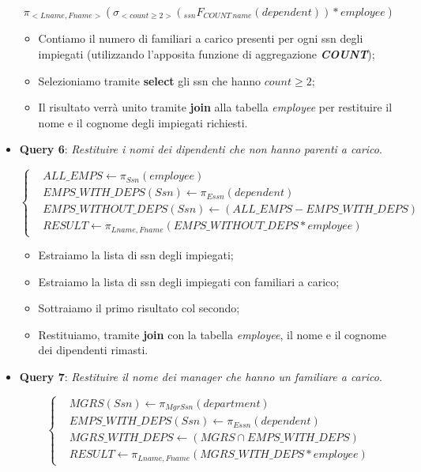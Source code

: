 \begin{itemize}
\[
	\pi_{<Lname,Fname>}(\sigma_{<count\geq 2>}(_{ssn}F_{COUNT\ name}(dependent))*employee)
\]

\begin{itemize}

\item Contiamo il numero di familiari a carico presenti per ogni ssn degli impiegati (utilizzando l’apposita funzione di aggregazione \textit{\textbf{COUNT}});
\item Selezioniamo tramite \textbf{select} gli ssn che hanno $count\geq 2$;
\item Il risultato verrà unito tramite \textbf{join} alla tabella \textit{employee} per restituire il nome e il cognome degli impiegati richiesti.

\end{itemize}

\item{\textbf{Query 6}}: \textit{Restituire i nomi dei dipendenti che non hanno parenti a carico}.

\[
	\left\{
	\begin{aligned}
	&ALL\_EMPS \leftarrow \pi_{Ssn}(employee)\\
	&EMPS\_WITH\_DEPS(Ssn) \leftarrow \pi_{Essn}(dependent)\\
	&EMPS\_WITHOUT\_DEPS(Ssn) \leftarrow (ALL\_EMPS - EMPS\_WITH\_DEPS)\\
	&RESULT \leftarrow \pi_{Lname,Fname}(EMPS\_WITHOUT\_DEPS * employee)
	\end{aligned}
	\right.
\]

\begin{itemize}

\item Estraiamo la lista di ssn degli impiegati;
\item Estraiamo la lista di ssn degli impiegati con familiari a carico;
\item Sottraiamo il primo risultato col secondo;
\item Restituiamo, tramite \textbf{join} con la tabella \textit{employee}, il nome e il cognome dei dipendenti rimasti. 

\end{itemize}

\item{\textbf{Query 7}}: \textit{Restituire il nome dei manager che hanno un familiare a carico}.

\[
	\left\{
	\begin{aligned}
	&MGRS(Ssn) \leftarrow \pi_{MgrSsn}(department)\\
	&EMPS\_WITH\_DEPS(Ssn) \leftarrow \pi_{Essn}(dependent)\\
	&MGRS\_WITH\_DEPS \leftarrow (MGRS \cap EMPS\_WITH\_DEPS)\\
	&RESULT \leftarrow \pi_{Lname,Fname}(MGRS\_WITH\_DEPS * employee)
	\end{aligned}
	\right.
\]


\end{itemize}
